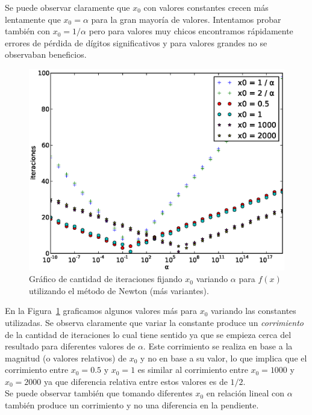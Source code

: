 Se puede observar claramente que $x_0$ con valores constantes crecen más
lentamente que $x_0 = \alpha$ para la gran mayoría de valores. Intentamos
probar también con $x_0 = 1 / \alpha$ pero para valores muy chicos encontramos
rápidamente errores de pérdida de dígitos significativos y para valores grandes
no se observaban beneficios.\\

\begin{figure}[!htbp]
  \begin{center}
    \includegraphics[scale=0.5]{graficos/new/f_newton_x0_fijo_2.eps}
    \caption{\label{fig:f_newton_x0_fijo_2} Gráfico de cantidad de iteraciones fijando $x_0$ variando $\alpha$ para $f(x)$ utilizando el método de Newton (más variantes).}
  \end{center}
\end{figure}

En la Figura~\ref{fig:f_newton_x0_fijo_2} graficamos algunos valores más para
$x_0$ variando las constantes utilizadas. Se observa claramente que variar la
constante produce un \emph{corrimiento} de la cantidad de iteraciones lo cual
tiene sentido ya que se empieza cerca del resultado para diferentes valores de
$\alpha$. Este corrimiento se realiza en base a la magnitud (o valores relativos)
de $x_0$ y no en base a su valor, lo que implica que el corrimiento entre $x_0
= 0.5$ y $x_0 = 1$ es similar al corrimiento entre $x_0 = 1000$ y $x_0 = 2000$
ya que diferencia relativa entre estos valores es de $1/2$.\\

Se puede observar también que tomando diferentes $x_0$ en relación lineal con
$\alpha$ también produce un corrimiento y no una diferencia en la pendiente.\\

